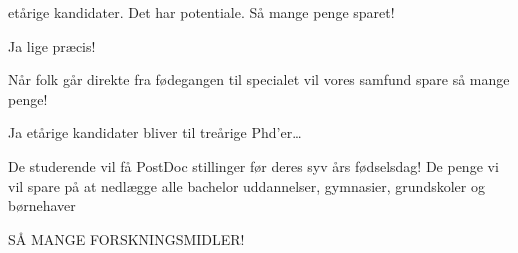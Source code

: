 \documentclass[a4paper,11pt]{article}
\begin{document}
\begin{sketch}
 etårige kandidater. Det har potentiale. Så mange penge sparet!

 Ja lige præcis!

 Når folk går direkte fra fødegangen til specialet vil vores samfund spare så mange penge!

 Ja etårige kandidater bliver til treårige Phd’er…

 De studerende vil få PostDoc stillinger før deres syv års fødselsdag! De penge vi vil spare på at nedlægge alle bachelor uddannelser, gymnasier, grundskoler og børnehaver

 SÅ MANGE FORSKNINGSMIDLER!




\end{sketch}
\end{document}
